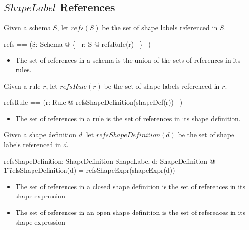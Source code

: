 \documentclass{article}
\begin{document}
\subsection{$ShapeLabel$ References}
Given a schema $S$, let $refs(S)$ be the set of shape labels referenced in $S$.
\begin{zed}
	refs == (\lambda S: Schema @ \bigcup \{~ r: \ran S @ refsRule(r) ~\} ~)
\end{zed}
\begin{itemize}
\item The set of references in a schema is the union of the sets of references in its rules.
\end{itemize}

Given a rule $r$, let $refsRule(r)$ be the set of shape labels referenced in $r$.
\begin{zed}
	refsRule == (\lambda r: Rule @ refsShapeDefinition(shapeDef(r)) ~)
\end{zed}
\begin{itemize}
\item The set of references in a rule is the set of references in its shape definition.
\end{itemize}

Given a shape definition $d$, let $refsShapeDefinition(d)$ be the set of shape labels referenced in $d$.
\begin{axdef}
	refsShapeDefinition: ShapeDefinition \fun \finset ShapeLabel
\where
	\forall d: ShapeDefinition @ \\
\t1		refsShapeDefinition(d) = refsShapeExpr(shapeExpr(d))
\end{axdef}
\begin{itemize}
\item The set of references in a closed shape definition is the set of references in its shape expression.
\item The set of references in an open shape definition is the set of references in its shape expression.
\end{itemize}
\end{document}

